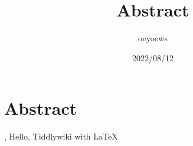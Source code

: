 \documentclass[UTF8]{article}
\title{Abstract \emoji{rocket}}
\author{oeyoews}
\date{2022/08/12}
\begin{document}
\maketitle

\section{ Abstract }%
\label{sec:emoji}

, Hello, Tiddlywiki with \LaTeX{}
\end{document}
